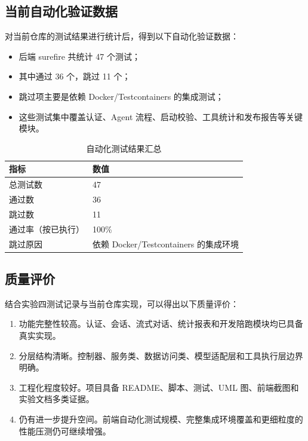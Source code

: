 \documentclass[12pt,a4paper,UTF8]{ctexart}
\begin{document}
\subsection{当前自动化验证数据}
对当前仓库的测试结果进行统计后，得到以下自动化验证数据：
\begin{itemize}
    \item 后端 surefire 共统计 47 个测试；
    \item 其中通过 36 个，跳过 11 个；
    \item 跳过项主要是依赖 Docker/Testcontainers 的集成测试；
    \item 这些测试集中覆盖认证、Agent 流程、启动校验、工具统计和发布报告等关键模块。
\end{itemize}

\begin{table}[H]
    \centering
    \caption{自动化测试结果汇总}
    \label{tab:test-summary}
    \begin{tabular}{p{3.2cm}p{2.4cm}}
        \toprule
        指标 & 数值 \\
        \midrule
        总测试数 & 47 \\
        通过数 & 36 \\
        跳过数 & 11 \\
        通过率（按已执行） & 100\% \\
        跳过原因 & 依赖 Docker/Testcontainers 的集成环境 \\
        \bottomrule
    \end{tabular}
\end{table}

\subsection{质量评价}
结合实验四测试记录与当前仓库实现，可以得出以下质量评价：
\begin{enumerate}
    \item 功能完整性较高。认证、会话、流式对话、统计报表和开发陪跑模块均已具备真实实现。
    \item 分层结构清晰。控制器、服务类、数据访问类、模型适配层和工具执行层边界明确。
    \item 工程化程度较好。项目具备 README、脚本、测试、UML 图、前端截图和实验文档多类证据。
    \item 仍有进一步提升空间。前端自动化测试规模、完整集成环境覆盖和更细粒度的性能压测仍可继续增强。
\end{enumerate}
\end{document}
